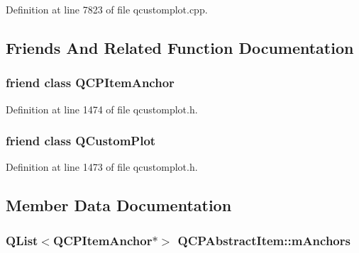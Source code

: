 Definition at line 7823 of file qcustomplot.\-cpp.



\subsection{Friends And Related Function Documentation}
\hypertarget{class_q_c_p_abstract_item_a61767d414fd57af9eb1741b34268c7fc}{
\subsubsection[{Q\-C\-P\-Item\-Anchor}]{\setlength{\rightskip}{0pt plus 5cm}friend class {\bf Q\-C\-P\-Item\-Anchor}\hspace{0.3cm}{\ttfamily [friend]}}}\label{class_q_c_p_abstract_item_a61767d414fd57af9eb1741b34268c7fc}


Definition at line 1474 of file qcustomplot.\-h.

\hypertarget{class_q_c_p_abstract_item_a1cdf9df76adcfae45261690aa0ca2198}{
\subsubsection[{Q\-Custom\-Plot}]{\setlength{\rightskip}{0pt plus 5cm}friend class {\bf Q\-Custom\-Plot}\hspace{0.3cm}{\ttfamily [friend]}}}\label{class_q_c_p_abstract_item_a1cdf9df76adcfae45261690aa0ca2198}


Definition at line 1473 of file qcustomplot.\-h.



\subsection{Member Data Documentation}
\hypertarget{class_q_c_p_abstract_item_a909a3abab783de302ebf0a0e6f2bbc15}{
\subsubsection[{m\-Anchors}]{\setlength{\rightskip}{0pt plus 5cm}Q\-List$<${\bf Q\-C\-P\-Item\-Anchor}$\ast$$>$ Q\-C\-P\-Abstract\-Item\-::m\-Anchors\hspace{0.3cm}{\ttfamily [protected]}}}\label{class_q_c_p_abstract_item_a909a3abab783de302ebf0a0e6f2bbc15}


